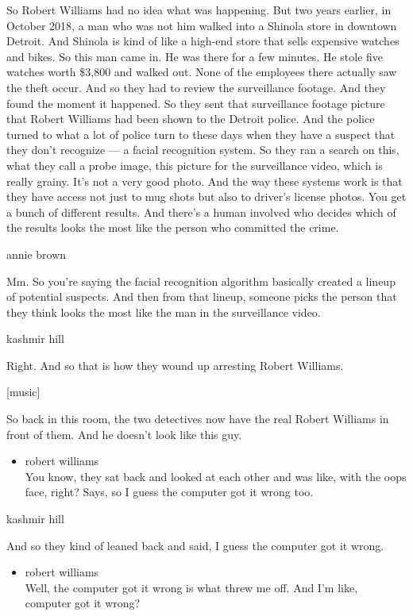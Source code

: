 So Robert Williams had no idea what was happening. But two years
earlier, in October 2018, a man who was not him walked into a Shinola
store in downtown Detroit. And Shinola is kind of like a high-end store
that sells expensive watches and bikes. So this man came in. He was
there for a few minutes. He stole five watches worth \$3,800 and walked
out. None of the employees there actually saw the theft occur. And so
they had to review the surveillance footage. And they found the moment
it happened. So they sent that surveillance footage picture that Robert
Williams had been shown to the Detroit police. And the police turned to
what a lot of police turn to these days when they have a suspect that
they don't recognize --- a facial recognition system. So they ran a
search on this, what they call a probe image, this picture for the
surveillance video, which is really grainy. It's not a very good photo.
And the way these systems work is that they have access not just to mug
shots but also to driver's license photos. You get a bunch of different
results. And there's a human involved who decides which of the results
looks the most like the person who committed the crime.

annie brown

Mm. So you're saying the facial recognition algorithm basically created
a lineup of potential suspects. And then from that lineup, someone picks
the person that they think looks the most like the man in the
surveillance video.

kashmir hill

Right. And so that is how they wound up arresting Robert Williams.

{[}music{]}

So back in this room, the two detectives now have the real Robert
Williams in front of them. And he doesn't look like this guy.

\begin{itemize}
\tightlist
\item
  robert williams\\
  You know, they sat back and looked at each other and was like, with
  the oops face, right? Says, so I guess the computer got it wrong too.
\end{itemize}

kashmir hill

And so they kind of leaned back and said, I guess the computer got it
wrong.

\begin{itemize}
\tightlist
\item
  robert williams\\
  Well, the computer got it wrong is what threw me off. And I'm like,
  computer got it wrong?
\end{itemize}

